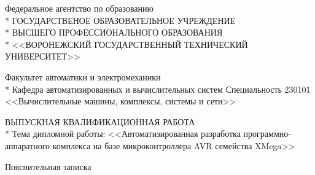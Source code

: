 \begin{center}
Федеральное агентство по образованию \\*
ГОСУДАРСТВЕНОЕ ОБРАЗОВАТЕЛЬНОЕ УЧРЕЖДЕНИЕ \\*
ВЫСШЕГО ПРОФЕССИОНАЛЬНОГО ОБРАЗОВАНИЯ \\*
<<ВОРОНЕЖСКИЙ ГОСУДАРСТВЕННЫЙ ТЕХНИЧЕСКИЙ УНИВЕРСИТЕТ>> \\
\end{center}

\begin{center}
Факультет  автоматики и электромеханики \\*
Кафедра автоматизированных и вычислительных систем
Специальность 230101 <<Вычислительные машины, комплексы, системы и сети>>
\end{center}

\vspace{3em}

\begin{center}
ВЫПУСКНАЯ КВАЛИФИКАЦИОННАЯ РАБОТА \\*
Тема дипломной работы: <<Автоматизированная разработка программно-аппаратного комплекса
на базе микроконтроллера AVR семейства XMega>> \\
\end{center}

\vspace{3em}

\begin{center}Пояснительная записка\end{center}

\vspace{3em}

